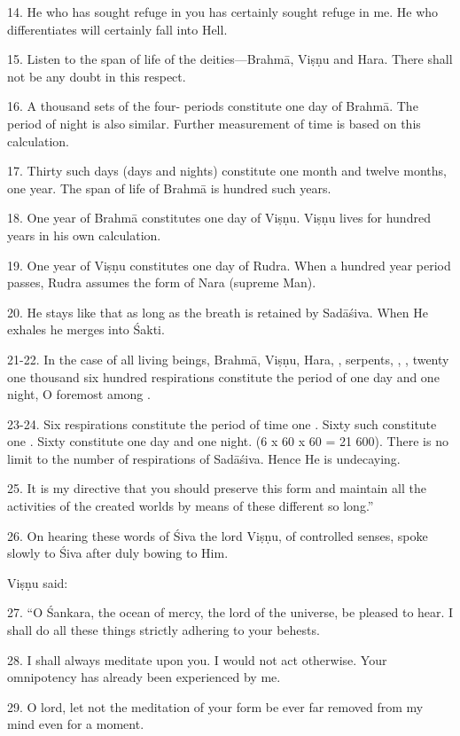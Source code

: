 14. He who has sought refuge in you has certainly sought refuge in me. He who
differentiates will certainly fall into Hell.

15. Listen to the span of life of the deities—Brahmā, Viṣṇu and Hara. There
shall not be any doubt in this respect.

16. A thousand sets of the four- periods constitute one day of Brahmā.
The period of night is also similar. Further measurement of time is based on
this calculation.

17. Thirty such days (days and nights) constitute one month and twelve months,
one year. The span of life of Brahmā is hundred such years.

18. One year of Brahmā constitutes one day of Viṣṇu. Viṣṇu lives for hundred
years in his own calculation.

19. One year of Viṣṇu constitutes one day of Rudra. When a hundred year period
passes, Rudra assumes the form of Nara (supreme Man).

20. He stays like that as long as the breath is retained by Sadāśiva. When He
exhales he merges into Śakti.

21-22. In the case of all living beings, Brahmā, Viṣṇu, Hara, ,
serpents, , \etc, twenty one thousand six hundred respirations
constitute the period of one day and one night, O foremost among .

23-24. Six respirations constitute the period of time one . Sixty such
 constitute one . Sixty  constitute one day and
one night. (6 x 60 x 60 = 21 600). There is no limit to the number of
respirations of Sadāśiva. Hence He is undecaying.

25. It is my directive that you should preserve this form and maintain all
the activities of the created worlds by means of these different  so
long.”

26. On hearing these words of Śiva the lord Viṣṇu, of controlled senses, spoke
slowly to Śiva after duly bowing to Him.

Viṣṇu said:

27. “O Śankara, the ocean of mercy, the lord of the universe, be pleased to hear.
I shall do all these things strictly adhering to your behests.

28. I shall always meditate upon you. I would not act otherwise. Your
omnipotency has already been experienced by me.

29. O lord, let not the meditation of your form be ever far removed from my mind
even for a moment.


